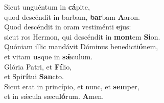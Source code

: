 \evenverse Sicut unguéntum in \textbf{cá}pite,~\*\\
\evenverse quod descéndit in barbam, \textbf{bar}bam \textbf{A}aron.\\
\oddverse Quod descéndit in oram vestiménti \textbf{e}jus:~\*\\
\oddverse sicut ros Hermon, qui descéndit in \textbf{mon}tem \textbf{Si}on.\\
\evenverse Quóniam illic mandávit Dóminus benedicti\textbf{ó}nem,~\*\\
\evenverse et vitam \textbf{us}que in \textbf{sǽ}culum.\\
\oddverse Glória Patri, et \textbf{Fí}lio,~\*\\
\oddverse et Spi\textbf{rí}tui \textbf{San}cto.\\
\evenverse Sicut erat in princípio, et nunc, et \textbf{sem}per,~\*\\
\evenverse et in sǽcula sæcu\textbf{ló}rum. \textbf{A}men.\\
